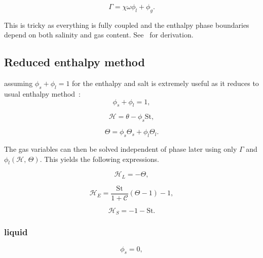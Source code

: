 \documentclass[a4paper,11pt]{article}
\numberwithin{equation}{section}
\begin{document}
\begin{equation}\label{eq:full-bulk-gas}
\Gamma = \chi \omega \phi_l + \phi_g.
\end{equation}

This is tricky as everything is fully coupled and the enthalpy phase boundaries depend on both salinity and gas content.
See~ for derivation.

\subsection{Reduced enthalpy method}\label{sec:Reduced-enthalpy-method}
assuming $\phi_s + \phi_l = 1$ for the enthalpy and salt is extremely useful as it reduces to usual enthalpy method~\cite{katz2008}:
\begin{equation}\label{eq:reduced-volume-sum}
\phi_s + \phi_l = 1,
\end{equation}

\begin{equation}\label{eq:reduced-bulk-enthalpy}
\mathcal{H} = \theta - \phi_s \text{St},
\end{equation}

\begin{equation}\label{eq:reduced-bulk-salinity}
\Theta = \phi_s \Theta_s + \phi_l \Theta_l.
\end{equation}

The gas variables can then be solved independent of phase later using only $\Gamma$ and $\phi_l(\mathcal{H}, \, \Theta)$.
This yields the following expressions.

\begin{equation}\label{eq:reduced-liquidus}
\mathcal{H}_L = -\Theta,
\end{equation}

\begin{equation}\label{eq:reduced-eutectic}
\mathcal{H}_E = \frac{\text{St}}{1+\mathcal{C}} (\Theta -1) -1,
\end{equation}

\begin{equation}\label{eq:reduced-solidus}
\mathcal{H}_S = -1 - \text{St}.
\end{equation}

\subsubsection{liquid}\label{ssub:liquid}

\begin{equation*}
\phi_s = 0,
\end{equation*}
\end{document}
